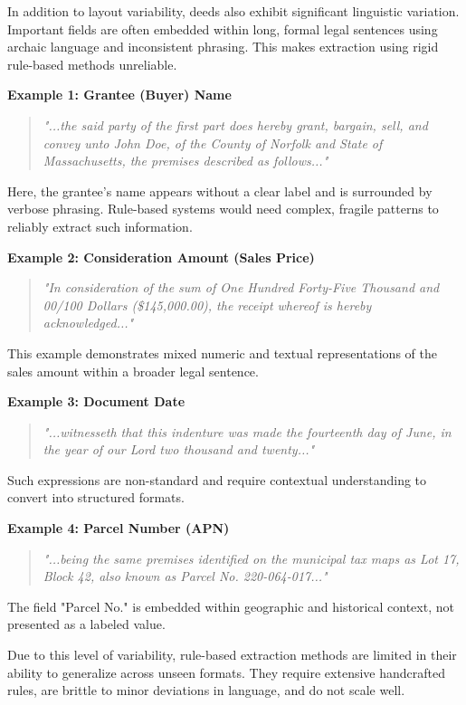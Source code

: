 \documentclass{article}
\begin{document}
In addition to layout variability, deeds also exhibit significant linguistic variation. Important fields are often embedded within long, formal legal sentences using archaic language and inconsistent phrasing. This makes extraction using rigid rule-based methods unreliable.

\textbf{Example 1: Grantee (Buyer) Name}
\begin{quote}
\textit{"...the said party of the first part does hereby grant, bargain, sell, and convey unto John Doe, of the County of Norfolk and State of Massachusetts, the premises described as follows..."}
\end{quote}

Here, the grantee's name appears without a clear label and is surrounded by verbose phrasing. Rule-based systems would need complex, fragile patterns to reliably extract such information.

\textbf{Example 2: Consideration Amount (Sales Price)}
\begin{quote}
\textit{"In consideration of the sum of One Hundred Forty-Five Thousand and 00/100 Dollars (\$145,000.00), the receipt whereof is hereby acknowledged..."}
\end{quote}

This example demonstrates mixed numeric and textual representations of the sales amount within a broader legal sentence.

\textbf{Example 3: Document Date}
\begin{quote}
\textit{"...witnesseth that this indenture was made the fourteenth day of June, in the year of our Lord two thousand and twenty..."}
\end{quote}

Such expressions are non-standard and require contextual understanding to convert into structured formats.

\textbf{Example 4: Parcel Number (APN)}
\begin{quote}
\textit{"...being the same premises identified on the municipal tax maps as Lot 17, Block 42, also known as Parcel No. 220-064-017..."}
\end{quote}

The field "Parcel No." is embedded within geographic and historical context, not presented as a labeled value.

Due to this level of variability, rule-based extraction methods are limited in their ability to generalize across unseen formats. They require extensive handcrafted rules, are brittle to minor deviations in language, and do not scale well.
\end{document}
